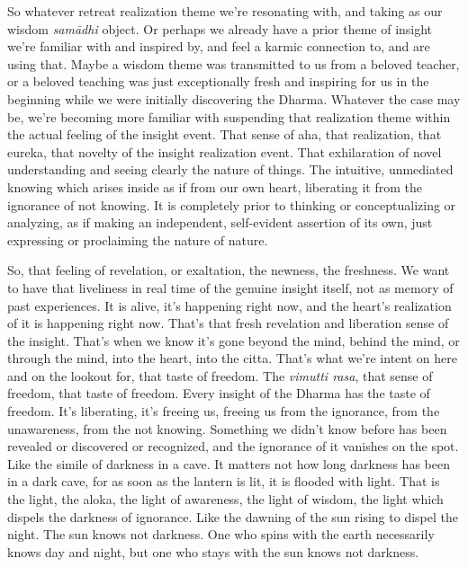 \documentclass[12pt,openany]{book}
\begin{document}
So whatever retreat realization theme we're resonating with,  and taking as our wisdom \textit{samādhi} object. Or perhaps we already have a prior theme of insight we're familiar with and inspired by, and feel a karmic connection to, and are using that. Maybe a wisdom theme was transmitted to us from a beloved teacher, or a beloved teaching was just exceptionally fresh and inspiring for us in the beginning while we were initially discovering the Dhar\-ma. Whatever the case may be, we're becoming more familiar with suspending that realization theme within the actual feeling of the insight event. That sense of aha, that realization, that eureka, that novelty of the insight realization event. That exhilaration of novel understanding and seeing clearly the nature of things. The intuitive, unmediated knowing which arises inside as if from our own heart, liberating it from the ignorance of not knowing. It is completely prior to thinking or conceptualizing or analyzing, as if making an independent, self-evident assertion of its own, just expressing or proclaiming the nature of nature.

So, that feeling of revelation, or exaltation, the newness, the freshness. We want to have that liveliness in real time of the genuine insight itself, not as memory of past experiences. It is alive, it's happening right now, and the heart's realization of it is happening right now. That's that fresh revelation and liberation sense of the insight. That's when we know it's gone beyond the mind, behind the mind, or through the mind, into the heart, into the citta. That's what we’re intent on here and on the lookout for, that taste of freedom. The \textit{vi\-mut\-ti ra\-sa}, that sense of freedom, that taste of freedom. Every insight of the Dhar\-ma has the taste of freedom. It's liberating, it's freeing us, freeing us from the ignorance, from the unawareness, from the not knowing. Something we didn't know before has been revealed or discovered or recognized, and the ignorance of it vanishes on the spot. Like the simile of darkness in a cave. It matters not how long darkness has been in a dark cave, for as soon as the lantern is lit, it is flooded with light. That is the light, the aloka, the light of awareness, the light of wisdom, the light which dispels the darkness of ignorance. Like the dawning of the sun rising to dispel the night. The sun knows not darkness. One who spins with the earth necessarily knows day and night, but one who stays with the sun knows not darkness.
\end{document}
